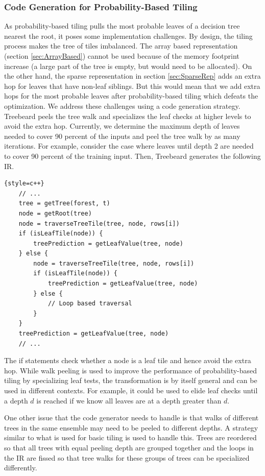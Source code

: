 {\subsubsection{Code Generation for Probability-Based Tiling}
As probability-based tiling pulls the most probable leaves of a decision tree nearest the root, it poses 
some implementation challenges. By design, the tiling process makes the tree of tiles 
imbalanced. The array based representation (section \ref{sec:ArrayBased})
cannot be used because of the memory footprint increase (a large part of the tree is empty, but would need to be allocated).
On the other hand, the sparse representation in section \ref{sec:SparseRep} adds 
an extra hop for leaves that have non-leaf siblings. But this would mean that we add extra hops for 
the most probable leaves after probability-based tiling which defeats the optimization.
We address these challenges using a code generation strategy. Treebeard peels 
the tree walk and specializes the leaf checks at higher levels to avoid the extra hop. Currently, 
we determine the maximum depth of leaves needed to cover 90 percent of the inputs and peel the tree 
walk by as many iterations. For example, consider the case where leaves until depth 2 are needed to 
cover 90 percent of the training input. Then, Treebeard generates the following IR. 

\begin{lstlisting}{style=c++}
    // ...
    tree = getTree(forest, t)
    node = getRoot(tree)
    node = traverseTreeTile(tree, node, rows[i])
    if (isLeafTile(node)) {
        treePrediction = getLeafValue(tree, node)
    } else {    
        node = traverseTreeTile(tree, node, rows[i])
        if (isLeafTile(node)) {
            treePrediction = getLeafValue(tree, node)
        } else {    
            // Loop based traversal 
        }
    }
    treePrediction = getLeafValue(tree, node)
    // ...
\end{lstlisting}

The if statements check whether a node is a leaf tile and hence avoid the extra hop. 
While walk peeling is used to improve the performance of probability-based tiling by specializing leaf tests,
the transformation is by itself general and can be used in different contexts. For example, it could be used 
to elide leaf checks until a depth $d$ is reached if we know all leaves are at a depth greater than $d$. 

One other issue that the code generator needs to handle is that walks of different trees in the same ensemble may 
need to be peeled to different depths. A strategy similar to what is used for basic tiling is used to handle this.
Trees are reordered so that all trees 
with equal peeling depth are grouped together and the loops in the IR are fissed so that tree walks 
for these groups of trees can be specialized differently.
}

